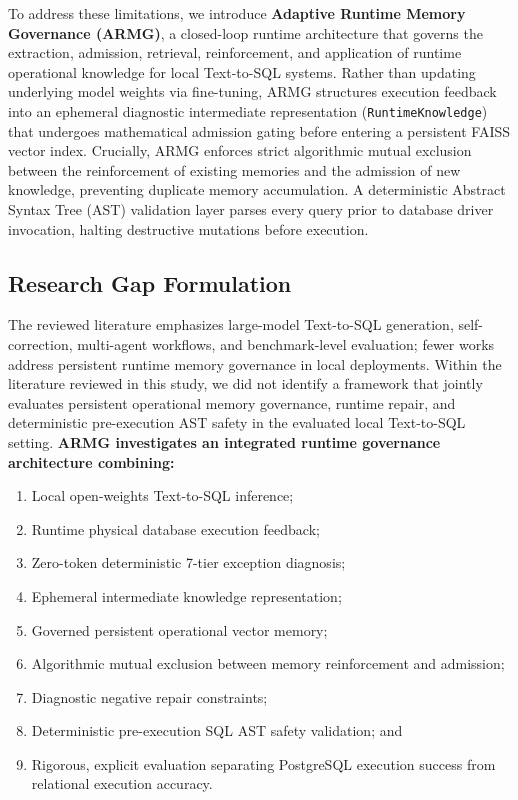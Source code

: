 To address these limitations, we introduce \textbf{Adaptive Runtime Memory Governance (ARMG)}, a closed-loop runtime architecture that governs the extraction, admission, retrieval, reinforcement, and application of runtime operational knowledge for local Text-to-SQL systems. Rather than updating underlying model weights via fine-tuning, ARMG structures execution feedback into an ephemeral diagnostic intermediate representation (\texttt{Runtime\-Knowledge}) that undergoes mathematical admission gating before entering a persistent FAISS vector index. Crucially, ARMG enforces strict algorithmic mutual exclusion between the reinforcement of existing memories and the admission of new knowledge, preventing duplicate memory accumulation. A deterministic Abstract Syntax Tree (AST) validation layer parses every query prior to database driver invocation, halting destructive mutations before execution.

\subsection{Research Gap Formulation}
The reviewed literature emphasizes large-model Text-to-SQL generation, self-correction, multi-agent workflows, and benchmark-level evaluation; fewer works address persistent runtime memory governance in local deployments. Within the literature reviewed in this study, we did not identify a framework that jointly evaluates persistent operational memory governance, runtime repair, and deterministic pre-execution AST safety in the evaluated local Text-to-SQL setting. \textbf{ARMG investigates an integrated runtime governance architecture combining:}
\begin{enumerate}
    \item Local open-weights Text-to-SQL inference;
    \item Runtime physical database execution feedback;
    \item Zero-token deterministic 7-tier exception diagnosis;
    \item Ephemeral intermediate knowledge representation;
    \item Governed persistent operational vector memory;
    \item Algorithmic mutual exclusion between memory reinforcement and admission;
    \item Diagnostic negative repair constraints;
    \item Deterministic pre-execution SQL AST safety validation; and
    \item Rigorous, explicit evaluation separating PostgreSQL execution success from relational execution accuracy.
\end{enumerate}

